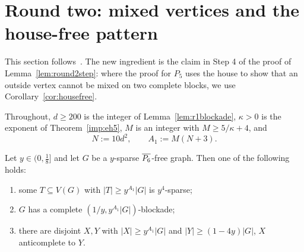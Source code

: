 \section{Round two: mixed vertices and the house-free pattern}\label{sec:round2}

This section follows~\cite[Lemmas 7.1 and 7.2]{NSS7}. The new ingredient is the claim in Step 4 of the proof of
Lemma~\ref{lem:round2step}: where the proof for $P_5$ uses the house to show that an outside vertex
cannot be mixed on two complete blocks, we use Corollary~\ref{cor:housefree}.

Throughout, $d\ge200$ is the integer of Lemma~\ref{lem:r1blockade}, $\kappa>0$ is the exponent of
Theorem~\ref{imp:eh5}, $M$ is an integer with $M\ge5/\kappa+4$, and
\[
N:=10d^2,\qquad A_1:=M(N+3).
\]

\begin{lemma}\label{lem:round2step}
Let $y\in(0,\frac18]$ and let $G$ be a $y$-sparse $\overline{P_6}$-free graph. Then one of the following holds:
\begin{enumerate}[label=(\alph*)]
\item some $T\subseteq V(G)$ with $|T|\ge y^{A_1}|G|$ is $y^4$-sparse;
\item $G$ has a complete $(1/y,y^{A_1}|G|)$-blockade;
\item there are disjoint $X,Y$ with $|X|\ge y^{A_1}|G|$ and $|Y|\ge(1-4y)|G|$, $X$ anticomplete to $Y$.
\end{enumerate}
\end{lemma}

